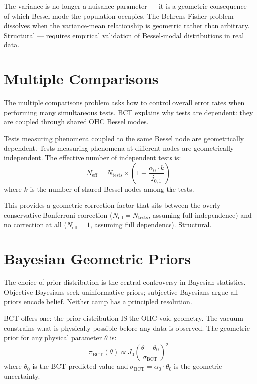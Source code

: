 \documentclass[aps,prl,twocolumn,superscriptaddress]{revtex4-2}
\begin{document}
The variance is no longer a nuisance parameter --- it is a geometric consequence of which Bessel mode the population occupies. The Behrens-Fisher problem dissolves when the variance-mean relationship is geometric rather than arbitrary. Structural --- requires empirical validation of Bessel-modal distributions in real data.

\section{Multiple Comparisons}

The multiple comparisons problem asks how to control overall error rates when performing many simultaneous tests. BCT explains why tests are dependent: they are coupled through shared OHC Bessel modes.

Tests measuring phenomena coupled to the same Bessel node are geometrically dependent. Tests measuring phenomena at different nodes are geometrically independent. The effective number of independent tests is:
\begin{equation}
N_{\mathrm{eff}} = N_{\mathrm{tests}} \times \left(1 - \frac{\alpha_0 \cdot k}{j_{0,1}}\right)
\end{equation}
where $k$ is the number of shared Bessel nodes among the tests.

This provides a geometric correction factor that sits between the overly conservative Bonferroni correction ($N_{\mathrm{eff}} = N_{\mathrm{tests}}$, assuming full independence) and no correction at all ($N_{\mathrm{eff}} = 1$, assuming full dependence). Structural.

\section{Bayesian Geometric Priors}

The choice of prior distribution is the central controversy in Bayesian statistics. Objective Bayesians seek uninformative priors; subjective Bayesians argue all priors encode belief. Neither camp has a principled resolution.

BCT offers one: the prior distribution IS the OHC void geometry. The vacuum constrains what is physically possible before any data is observed. The geometric prior for any physical parameter $\theta$ is:
\begin{equation}
\pi_{\mathrm{BCT}}(\theta) \propto J_0\left(\frac{\theta - \theta_0}{\sigma_{\mathrm{BCT}}}\right)^2
\end{equation}
where $\theta_0$ is the BCT-predicted value and $\sigma_{\mathrm{BCT}} = \alpha_0 \cdot \theta_0$ is the geometric uncertainty.
\end{document}
